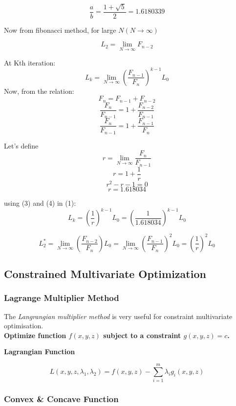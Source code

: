 \documentclass[12pt, letterpaper]{article}
\begin{document}
$$  \frac{a}{b} = \frac{1 + \sqrt{5}}{2} = 1.6180339$$

Now from fibonacci method, for large $N (N \rightarrow \infty)$

$$ L_2 = \lim_{N \rightarrow \infty} F_{n-2} $$

At Kth  iteration:
$$ L_k = \lim_{N \rightarrow \infty} (\frac{F_{n-1}}{F_n})^{k-1} L_0 $$
Now, from the relation:
$$ F_n = F_{n-1} + F_{n-2} $$
$$ \frac{F_n}{F_{n-1}} = 1 + \frac{F_{n-2}}{F_{n-1}} $$
\begin{equation}\frac{F_n}{F_{n-1}} = 1 + \frac{F_{n-1}}{F_n} \end{equation}

Let’s define
\begin{equation} r = \lim_{N \rightarrow \infty} \frac{F_n}{F_{n-1}}  \end{equation}
\begin{equation} r = 1 + \frac{1}{r} \end{equation}
\begin{equation} r^2 - r -1 = 0\end{equation}
\begin{equation}
  r = 1.618034  
\end{equation}

using (3) and (4) in (1):
$$ L_k = (\frac{1}{r})^{k-1} L_0
      = (\frac{1}{1.618034})^{k-1} L_0 $$

$$ L_2^* = \lim_{N \rightarrow \infty} (\frac{F_{n-2}}{F_n}) L_0
        = \lim_{N \rightarrow \infty} (\frac{F_{n-1}}{F_n})^2 L_0
        = (\frac{1}{r})^2 L_0 $$


\subsection{Constrained Multivariate Optimization}
\subsubsection{Lagrange Multiplier Method}
The \emph{Langrangian multiplier method} is very useful for constraint multivariate optimisation.\\
\textbf{Optimize function $f(x,y,z)$ subject to a constraint $g(x,y,z)=c$.}

\textbf{Lagrangian Function}

$$L(x,y,z,\lambda_1,\lambda_2) = f(x,y,z) - \sum_{i=1}^{m} \lambda_i g_i(x,y,z)$$

\subsubsection{Convex \& Concave Function}
\end{document}
